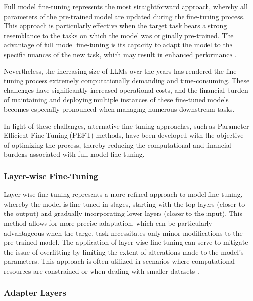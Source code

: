 Full model fine-tuning represents the most straightforward approach, whereby all parameters of the pre-trained model are updated during the fine-tuning process. This approach is particularly effective when the target task bears a strong resemblance to the tasks on which the model was originally pre-trained. The advantage of full model fine-tuning is its capacity to adapt the model to the specific nuances of the new task, which may result in enhanced performance \cite{howard2018universal}.

Nevertheless, the increasing size of LLMs over the years has rendered the fine-tuning process extremely computationally demanding and time-consuming. These challenges have significantly increased operational costs, and the financial burden of maintaining and deploying multiple instances of these fine-tuned models becomes especially pronounced when managing numerous downstream tasks.

In light of these challenges, alternative fine-tuning approaches, such as Parameter Efficient Fine-Tuning (PEFT) methods, have been developed with the objective of optimizing the process, thereby reducing the computational and financial burdens associated with full model fine-tuning.

\subsubsection{Layer-wise Fine-Tuning}

Layer-wise fine-tuning represents a more refined approach to model fine-tuning, whereby the model is fine-tuned in stages, starting with the top layers (closer to the output) and gradually incorporating lower layers (closer to the input). This method allows for more precise adaptation, which can be particularly advantageous when the target task necessitates only minor modifications to the pre-trained model. The application of layer-wise fine-tuning can serve to mitigate the issue of overfitting by limiting the extent of alterations made to the model's parameters. This approach is often utilized in scenarios where computational resources are constrained or when dealing with smaller datasets \cite{ro2021autolr}.

\subsubsection{Adapter Layers}

